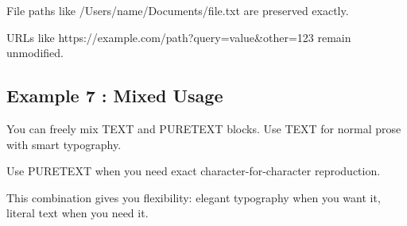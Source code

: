\documentclass[a4paper,10pt,fleqn]{article}
\begin{document}
File paths like /Users/name/Documents/file.txt are preserved exactly.

\bigskip

\bigskip

URLs like https://example.com/path?query=value\&other=123 remain unmodified.

\bigskip

\subsection*{Example 7 : Mixed Usage}

\noindent You can freely mix TEXT and PURETEXT blocks. Use TEXT for normal prose with smart typography.

\bigskip

\bigskip

Use PURETEXT when you need exact character-for-character reproduction.

\bigskip

\noindent This combination gives you flexibility: elegant typography when you want it, literal text when you need it.

\bigskip
\end{document}
